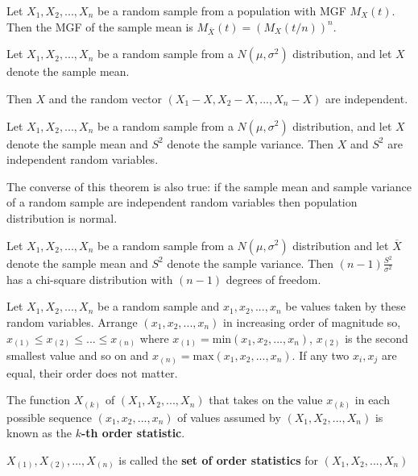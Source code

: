 \begin{thm}
    Let $X_1, X_2, ..., X_n$ be a random sample from a population with MGF $M_X(t)$. Then the MGF of the sample mean is $M_{\bar{X}} (t) = (M_X (t/n))^n$.
\end{thm}

\begin{thm}
    Let $X_1, X_2, . . . , X_n$ be a random sample from a $N(\mu, \sigma^2)$ distribution, and let $X$ denote the sample mean.

    Then $X$ and the random vector $(X_1 - X, X_2 - X, . . . , X_n - X)$ are independent.
\end{thm}

\begin{thm}
    Let $X_1, X_2, . . . , X_n$ be a random sample from a $N(\mu, \sigma^2)$ distribution, 
    and let $X$ denote the sample mean and $S^2$ denote the sample variance. Then $X$ and $S^2$ are independent random variables.
\end{thm}
The converse of this theorem is also true: if the sample mean and sample variance of a random sample are independent random variables then population distribution is normal.

\begin{thm}
    Let $X_1, X_2, ... , X_n$ be a random sample from a $N(\mu, \sigma^2)$ distribution and let $\overline{X}$ denote the sample mean and $S^2$ denote the sample variance. Then $(n-1) \frac{S^2}{\sigma^2}$ has a chi-square distribution with $(n-1)$ degrees of freedom.
\end{thm}

\begin{defn}
    Let $X_1, X_2, ..., X_n$ be a random sample and $x_1, x_2, ..., x_n$ be values taken by these random variables.
    Arrange $(x_1, x_2, ..., x_n)$ in increasing order of magnitude so, $x_{(1)} \leq x_{(2)} \leq ... \leq x_{(n)}$
    where $x_{(1)} = \text{min}(x_1, x_2, ..., x_n)$, $x_{(2)}$ is the second smallest value and so on and $x_{(n)} = \text{max}(x_1, x_2, ..., x_n)$. If any two $x_i, x_j$ are equal, their order does not matter.

    
    The function $X_{(k)}$ of $(X_1, X_2, ..., X_n)$ that takes on the value $x_{(k)}$ in each possible sequence $(x_1, x_2, ... , x_n)$ of values assumed by $(X_1, X_2, ..., X_n)$ is known as the \textbf{$k$-th order statistic}. 

    ${X_{(1)}, X_{(2)}, ..., X_{(n)}}$ is called the \textbf{set of order statistics} for $(X_1, X_2, ..., X_n)$
\end{defn}

